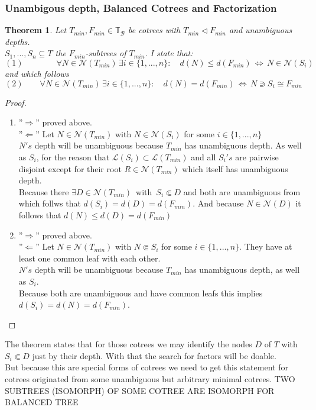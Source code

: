 \documentclass[a4paper,12pt]{article}
\newtheorem{theorem}{Theorem}[section]
\theoremstyle{definition}
\begin{document}
		\subsubsection{Unambigous depth, Balanced Cotrees and Factorization}
		\begin{theorem}
			Let $T_{min},F_{min}\in\mathds{T}_{\mathcal{B}}$ be cotrees with $T_{min}\vartriangleleft F_{min}$ and unambiguous depths.\\ $S_1,...,S_n\subseteq T$ the $F_{min}$-subtrees of $T_{min}$. I state that:
			\[(1)\qquad \qquad \forall N\in \mathcal{N}(T_{min})\, \exists i\in\{1,...,n\}:\quad d(N)\leq d(F_{min})\,\Longleftrightarrow\, N\in \mathcal{N}(S_i) \]
			and which follows
			\[(2)\qquad \forall N\in \mathcal{N}(T_{min})\, \exists i\in\{1,...,n\}:\quad d(N)= d(F_{min})\,\Longleftrightarrow\, N \Supset S_i\cong F_{min} \]
		\end{theorem}
	\begin{proof}
		\begin{enumerate}[(1)]
			\item ''$\Rightarrow$'' proved above.\\
			''$\Leftarrow$'' Let $N\in\mathcal{N}(T_{min})$ with $N\in \mathcal{N}(S_i)$ for some $i\in\{1,...,n\}$\\
			$N's$ depth will be unambiguous because $T_{min}$ has unambiguous depth. As well as $S_i$, for the reason that $\mathcal{L}(S_i)\subset \mathcal{L}(T_{min})$ and all $S_i's$ are pairwise disjoint except for their root $R\in \mathcal{N}(T_{min})$ which itself has unambiguous depth.\\
			Because there $\exists D\in \mathcal{N}(T_{min})\,  $ with $\,S_i\Subset D$ and both are unambiguous from which follws that $d(S_i)=d(D)=d(F_{min})$. And because $N\in \mathcal{N}(D)$ it follows that $d(N)\leq d(D)=d(F_{min})$ 
			\item ''$\Rightarrow$'' proved above.\\
			''$\Leftarrow$'' Let $N\in\mathcal{N}(T_{min})$ with $N \Subset S_i$ for some $i\in\{1,...,n\}$. They have at least one common leaf with each other.\\
			$N's$ depth will be unambiguous because $T_{min}$ has unambiguous depth, as well as $S_i$.\\
			Because both are unambiguous and have common leafs this implies $d(S_i)=d(N)=d(F_{min})$.
		\end{enumerate}
	\end{proof}
		The theorem states that for those cotrees we may identify the nodes $D$ of $T$ with $S_i \Subset D$ just by their depth. With that the search for factors will be doable.\\
		But because this are special forms of cotrees we need to get this statement for cotrees originated from some unambiguous but arbitrary minimal cotrees. 
		TWO SUBTREES (ISOMORPH) OF SOME COTREE ARE ISOMORPH FOR BALANCED TREE
		
\end{document}
